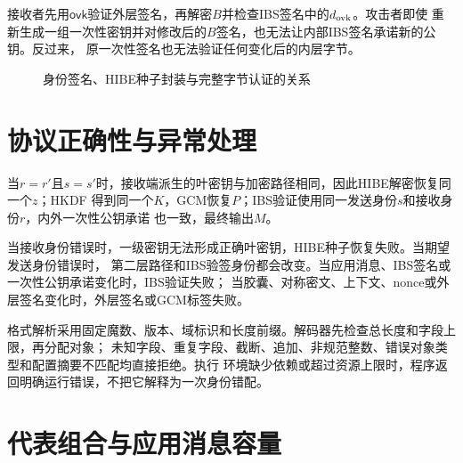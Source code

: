 接收者先用$\mathsf{ovk}$验证外层签名，再解密$B$并检查IBS签名中的$d_{\rm ovk}$。攻击者即使
重新生成一组一次性密钥并对修改后的$B$签名，也无法让内部IBS签名承诺新的公钥。反过来，
原一次性签名也无法验证任何变化后的内层字节。

\begin{figure}[H]
\centering
{}
\caption{身份签名、HIBE种子封装与完整字节认证的关系}
\label{fig:protocol-generation}
\end{figure}

\section{协议正确性与异常处理}

当$r=r'$且$s=s'$时，接收端派生的叶密钥与加密路径相同，因此HIBE解密恢复同一个$z$；HKDF
得到同一个$K$，GCM恢复$P$；IBS验证使用同一发送身份$s$和接收身份$r$，内外一次性公钥承诺
也一致，最终输出$M$。

当接收身份错误时，一级密钥无法形成正确叶密钥，HIBE种子恢复失败。当期望发送身份错误时，
第二层路径和IBS验签身份都会改变。当应用消息、IBS签名或一次性公钥承诺变化时，IBS验证失败；
当胶囊、对称密文、上下文、nonce或外层签名变化时，外层签名或GCM标签失败。

格式解析采用固定魔数、版本、域标识和长度前缀。解码器先检查总长度和字段上限，再分配对象；
未知字段、重复字段、截断、追加、非规范整数、错误对象类型和配置摘要不匹配均直接拒绝。执行
环境缺少依赖或超过资源上限时，程序返回明确运行错误，不把它解释为一次身份错配。

\section{代表组合与应用消息容量}

